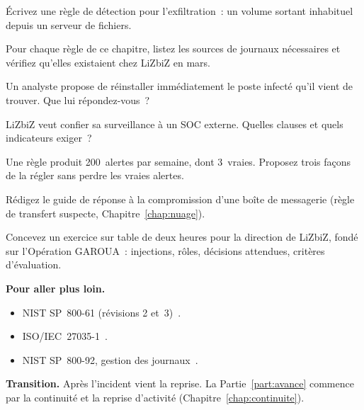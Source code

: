 \begin{boxexo}[title={\ding{45}\quad Exercice~22.4. Une règle \niveaumoyen}]
Écrivez une règle de détection pour l'exfiltration~: un volume sortant
inhabituel depuis un serveur de fichiers.
\end{boxexo}

\begin{boxexo}[title={\ding{45}\quad Exercice~22.5. Les journaux nécessaires \niveaumoyen}]
Pour chaque règle de ce chapitre, listez les sources de journaux
nécessaires et vérifiez qu'elles existaient chez LiZbiZ en mars.
\end{boxexo}

\begin{boxexo}[title={\ding{45}\quad Exercice~22.6. Confiner ou éradiquer \niveaumoyen}]
Un analyste propose de réinstaller immédiatement le poste infecté qu'il
vient de trouver. Que lui répondez-vous~?
\end{boxexo}

\begin{boxexo}[title={\ding{45}\quad Exercice~22.7. Externaliser \niveaumoyen}]
LiZbiZ veut confier sa surveillance à un SOC externe. Quelles clauses et
quels indicateurs exiger~?
\end{boxexo}

\begin{boxexo}[title={\ding{45}\quad Exercice~22.8. Faux positifs \niveaumoyen}]
Une règle produit 200~alertes par semaine, dont 3~vraies. Proposez trois
façons de la régler sans perdre les vraies alertes.
\end{boxexo}

\begin{boxexo}[title={\ding{45}\quad Exercice~22.9. Un guide \niveauexpert}]
Rédigez le guide de réponse à la compromission d'une boîte de
messagerie (règle de transfert suspecte, Chapitre~\ref{chap:nuage}).
\end{boxexo}

\begin{boxexo}[title={\ding{45}\quad Exercice~22.10. L'exercice sur table \niveauexpert}]
Concevez un exercice sur table de deux heures pour la direction de LiZbiZ,
fondé sur l'Opération GAROUA~: injections, rôles, décisions attendues,
critères d'évaluation.
\end{boxexo}

\bigskip

\begin{boxinfo}
\textbf{Pour aller plus loin.}
\begin{itemize}
    \item NIST SP~800-61 (révisions 2 et~3)~\cite{nist80061r2,nist80061r3}.
    \item ISO/IEC~27035-1~\cite{iso27035_2023}.
    \item NIST SP~800-92, gestion des journaux~\cite{nist80092}.
\end{itemize}
\end{boxinfo}

\begin{boxinfo}
\textbf{Transition.} Après l'incident vient la reprise. La
Partie~\ref{part:avance} commence par la continuité et la reprise
d'activité (Chapitre~\ref{chap:continuite}).
\end{boxinfo}
